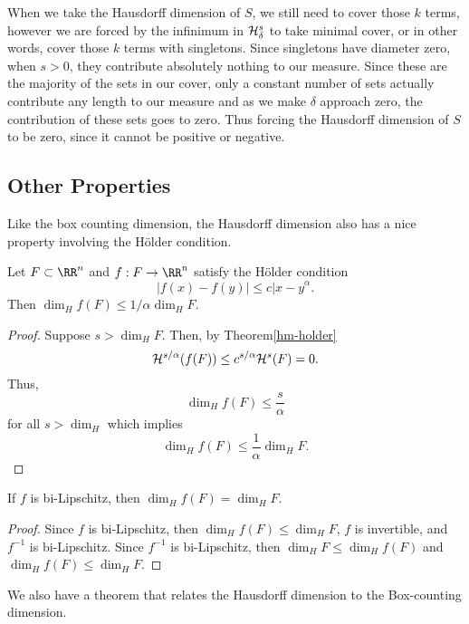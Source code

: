 When we take the Hausdorff dimension of $S$, we still need to cover those $k$ terms, however we are forced by the infinimum in $\mathcal{H}^s_\delta$ to take minimal cover, or in other words, cover those $k$ terms with singletons.
Since singletons have diameter zero, when $s>0$, they contribute absolutely nothing to our measure.
Since these are the majority of the sets in our cover, only a constant number of sets actually contribute any length to our measure and as we make $\delta$ approach zero, the contribution of these sets goes to zero.
Thus forcing the Hausdorff dimension of $S$ to be zero, since it cannot be positive or negative.

\subsection{Other Properties}

Like the box counting dimension, the Hausdorff dimension also has a nice property involving the H\"older condition.

\begin{thm}\label{hd-holder}
	Let $F\subset\RR^n$ and $f:F\rightarrow\RR^n$ satisfy the H\"older condition
	\[
		|f(x)-f(y)|\leq c{|x-y}^\alpha.
	\]
	Then $\dim_H f(F) \leq 1/\alpha \dim_H F$.
\end{thm}

\begin{proof}
	Suppose $s>\dim_H F$.
	Then, by Theorem\autoref{hm-holder}
	\[
		\mathcal{H}^{s/\alpha}(f(F))\leq c^{s/\alpha}\mathcal{H}^s(F)=0.
	\]
	Thus,
	\[
		\dim_H f(F) \leq \frac{s}{\alpha}
	\]
	for all $s > \dim_H$ which implies
	\[
		\dim_H f(F) \leq \frac{1}{\alpha}\dim_H F.
	\]
\end{proof}

\begin{corollary}
	If $f$ is bi-Lipschitz, then $\dim_H f(F)=\dim_H F$.
\end{corollary}

\begin{proof}
	Since $f$ is bi-Lipschitz, then $\dim_H f(F)\leq \dim_H F$, $f$ is invertible, and $f^{-1}$ is bi-Lipschitz.
	Since $f^{-1}$ is bi-Lipschitz, then $\dim_H F \leq \dim_H f(F)$ and $\dim_H f(F)\leq \dim_H F$.
\end{proof}

We also have a theorem that relates the Hausdorff dimension to the Box-counting dimension.

